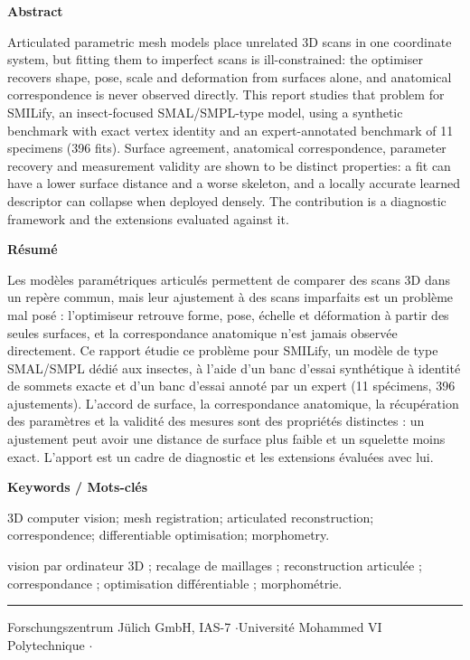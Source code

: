 \thispagestyle{empty}
\vspace*{0.5cm}
{\large\bfseries\color{accent} Abstract}\par
\vspace{0.2cm}
Articulated parametric mesh models place unrelated 3D scans in one coordinate
system, but fitting them to imperfect scans is ill-constrained: the optimiser
recovers shape, pose, scale and deformation from surfaces alone, and
anatomical correspondence is never observed directly. This report studies
that problem for SMILify, an insect-focused SMAL/SMPL-type model, using a
synthetic benchmark with exact vertex identity and an expert-annotated
benchmark of 11 specimens (396 fits). Surface agreement, anatomical
correspondence, parameter recovery and measurement validity are shown to be
distinct properties: a fit can have a lower surface distance and a worse
skeleton, and a locally accurate learned descriptor can collapse when deployed
densely. The contribution is a diagnostic framework and the extensions
evaluated against it.

\vspace{0.5cm}
{\large\bfseries\color{accent} R\'esum\'e}\par
\vspace{0.2cm}
Les mod\`eles param\'etriques articul\'es permettent de comparer des scans 3D
dans un rep\`ere commun, mais leur ajustement \`a des scans imparfaits est un
probl\`eme mal pos\'e : l'optimiseur retrouve forme, pose, \'echelle et
d\'eformation \`a partir des seules surfaces, et la correspondance
anatomique n'est jamais observ\'ee directement. Ce rapport \'etudie ce
probl\`eme pour SMILify, un mod\`ele de type SMAL/SMPL d\'edi\'e aux insectes,
\`a l'aide d'un banc d'essai synth\'etique \`a identit\'e de sommets exacte et
d'un banc d'essai annot\'e par un expert (11 sp\'ecimens, 396 ajustements).
L'accord de surface, la correspondance anatomique, la r\'ecup\'eration des
param\`etres et la validit\'e des mesures sont des propri\'et\'es distinctes :
un ajustement peut avoir une distance de surface plus faible et un squelette
moins exact. L'apport est un cadre de diagnostic et les extensions
\'evalu\'ees avec lui.

\vspace{0.5cm}
{\large\bfseries\color{accent} Keywords / Mots-cl\'es}\par
\vspace{0.2cm}
3D computer vision; mesh registration; articulated reconstruction;
correspondence; differentiable optimisation; morphometry.\par
vision par ordinateur 3D ; recalage de maillages ; reconstruction articul\'ee ;
correspondance ; optimisation diff\'erentiable ; morphom\'etrie.

\vfill
\textcolor{rule}{\rule{\linewidth}{0.6pt}}\par
\vspace{0.2cm}
Forschungszentrum J\"ulich GmbH, IAS-7 \quad$\cdot$\quad Universit\'e Mohammed VI
Polytechnique \quad$\cdot$
